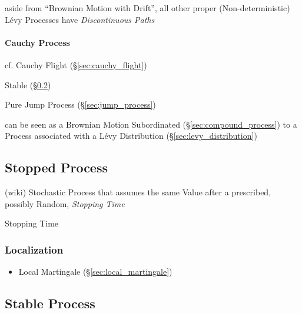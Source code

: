 aside from ``Brownian Motion with Drift'', all other proper (Non-deterministic)
L\'evy Processes have \emph{Discontinuous Paths}



\paragraph{Cauchy Process}\label{sec:cauchy_process}\hfill

\fist cf. Cauchy Flight (\S\ref{sec:cauchy_flight})

Stable (\S\ref{sec:stable_process})

Pure Jump Process (\S\ref{sec:jump_process})

can be seen as a Brownian Motion Subordinated (\S\ref{sec:compound_process}) to
a Process associated with a L\'evy Distribution (\S\ref{sec:levy_distribution})



\subsection{Stopped Process}\label{sec:stopped_process}

(wiki) Stochastic Process that assumes the same Value after a prescribed,
possibly Random, \emph{Stopping Time}

Stopping Time



\subsubsection{Localization}\label{sec:localization}

\begin{itemize}
  \item Local Martingale (\S\ref{sec:local_martingale})
\end{itemize}



\subsection{Stable Process}\label{sec:stable_process}

